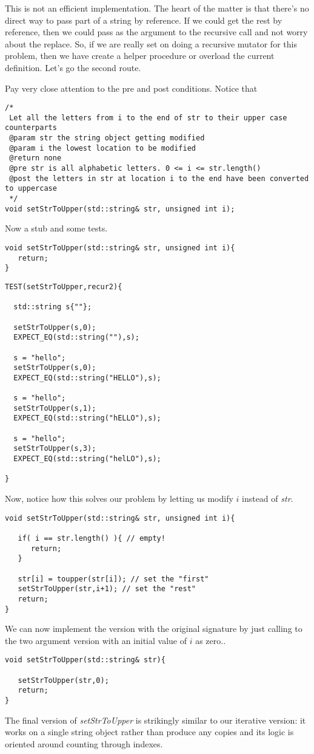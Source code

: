 \documentclass[]{tufte-handout}
\begin{document}
This is not an efficient implementation. The heart of the matter is that there's no direct way to pass part of a string by reference.  If we could get the rest by reference, then we could pass as the argument to the recursive call and not worry about the replace.  So, if we are really set on doing a recursive mutator for this problem, then we have create a helper procedure or overload the current definition. Let's go the second route.

Pay very close attention to the pre and post conditions. Notice that 
\begin{verbatim}
/*
 Let all the letters from i to the end of str to their upper case counterparts
 @param str the string object getting modified
 @param i the lowest location to be modified
 @return none
 @pre str is all alphabetic letters. 0 <= i <= str.length()
 @post the letters in str at location i to the end have been converted to uppercase
 */
void setStrToUpper(std::string& str, unsigned int i);
\end{verbatim}

Now a stub and some tests.
\begin{verbatim}
void setStrToUpper(std::string& str, unsigned int i){
   return;
}
\end{verbatim}

\begin{verbatim}
TEST(setStrToUpper,recur2){

  std::string s{""};
  
  setStrToUpper(s,0);
  EXPECT_EQ(std::string(""),s);
  
  s = "hello";
  setStrToUpper(s,0);
  EXPECT_EQ(std::string("HELLO"),s);  
  
  s = "hello";
  setStrToUpper(s,1);
  EXPECT_EQ(std::string("hELLO"),s);  
  
  s = "hello";
  setStrToUpper(s,3);
  EXPECT_EQ(std::string("helLO"),s);  

}
\end{verbatim}

Now, notice how this solves our problem by letting us modify $i$ instead of \textit{str}.
\begin{verbatim}
void setStrToUpper(std::string& str, unsigned int i){
   
   if( i == str.length() ){ // empty!
      return;
   }
   
   str[i] = toupper(str[i]); // set the "first"
   setStrToUpper(str,i+1); // set the "rest"
   return;
}
\end{verbatim}

We can now implement the version with the original signature by just calling to the two argument version with an initial value of $i$ as zero..
\begin{verbatim}
void setStrToUpper(std::string& str){

   setStrToUpper(str,0);
   return;
}
\end{verbatim}

The final version of \textit{setStrToUpper} is strikingly similar to our iterative version:  it works on a single string object rather than produce any copies and its logic is oriented around counting through indexes.  
\end{document}
